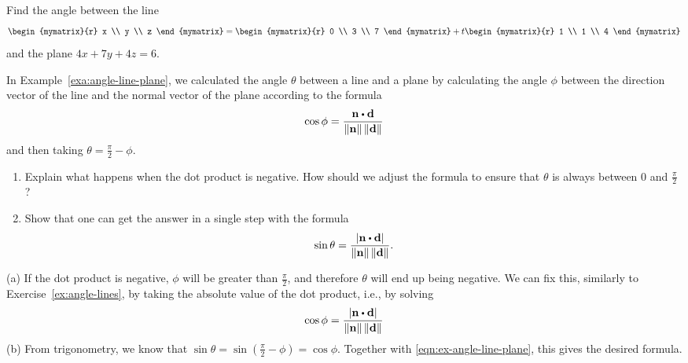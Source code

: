 \begin{ex}
  Find the angle between the line
  \begin{equation*}
    \begin{mymatrix}{r} x \\ y \\ z \end{mymatrix}
    = \begin{mymatrix}{r} 0 \\ 3 \\ 7 \end{mymatrix}
    + t \begin{mymatrix}{r} 1 \\ 1 \\ 4 \end{mymatrix}
  \end{equation*}
  and the plane $4x+7y+4z = 6$.
\end{ex}

\begin{ex}
  In Example~\ref{exa:angle-line-plane}, we calculated the angle
  $\theta$ between a line and a plane by calculating the angle $\phi$
  between the direction vector of the line and the normal vector of
  the plane according to the formula
  \begin{equation*}
    \cos\phi =
    \frac{\vect{n}\dotprod\vect{d}}{\norm{\vect{n}}\norm{\vect{d}}}
  \end{equation*}
  and then taking $\theta = \frac{\pi}{2}-\phi$.
  \begin{enumerate}
  \item Explain what happens when the dot product is negative. How
    should we adjust the formula to ensure that $\theta$ is always
    between $0$ and $\frac{\pi}{2}$?
  \item Show that one can get the answer in a single step with the
    formula
    \begin{equation*}
      \sin\theta =
      \frac{\abs{\vect{n}\dotprod\vect{d}}}{\norm{\vect{n}}\norm{\vect{d}}}.
    \end{equation*}
  \end{enumerate}
  \begin{sol}
    (a) If the dot product is negative, $\phi$ will be greater than
    $\frac{\pi}{2}$, and therefore $\theta$ will end up being
    negative. We can fix this, similarly to
    Exercise~\ref{ex:angle-lines}, by taking the absolute value of the
    dot product, i.e., by solving
    \begin{equation}\label{eqn:ex-angle-line-plane}
      \cos\phi =
      \frac{\abs{\vect{n}\dotprod\vect{d}}}{\norm{\vect{n}}\norm{\vect{d}}}
    \end{equation}
    (b) From trigonometry, we know that $\sin\theta =
    \sin(\frac{\pi}{2}-\phi) = \cos\phi$. Together with
    {\eqref{eqn:ex-angle-line-plane}}, this gives the desired formula.
  \end{sol}
\end{ex}

